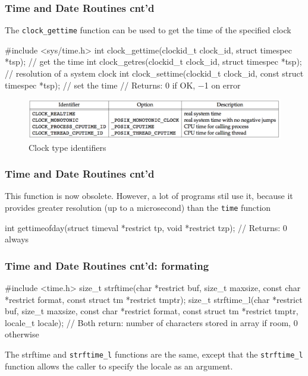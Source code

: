 \documentclass[newPxFont,sthlmFooter,nooffset]{beamer}
\begin{document}
\begin{frame}[containsverbatim,t]
  \frametitle{Time and Date Routines cnt'd}

The \texttt{clock\_gettime} function can be used to get the time of the specified clock

\begin{codedef}
#include <sys/time.h>
int clock_gettime(clockid_t clock_id, struct timespec *tsp); // get the time
int clock_getres(clockid_t clock_id, struct timespec *tsp); // resolution of a system clock
int clock_settime(clockid_t clock_id, const struct timespec *tsp); // set the time
// Returns: 0 if OK, −1 on error
\end{codedef}

\begin{figure}[h]
  \centering
  \includegraphics[width=\textwidth]{figure/fig6-8_clock.png}
  \caption{Clock type identifiers}
\end{figure}

\end{frame}

\begin{frame}[containsverbatim,t]
  \frametitle{Time and Date Routines cnt'd}
This function is now obsolete. However, a lot of programs stil use it, because it provides greater resolution (up to a microsecond) than the \texttt{time} function
\begin{codedef}
int gettimeofday(struct timeval *restrict tp, void *restrict tzp);
// Returns: 0 always
\end{codedef}


\end{frame}


\begin{frame}[containsverbatim,t]
  \frametitle{Time and Date Routines cnt'd: formating}

\begin{codedef}
#include <time.h>
size_t strftime(char *restrict buf, size_t maxsize, const char *restrict format, const struct tm *restrict tmptr);
size_t strftime_l(char *restrict buf, size_t maxsize, const char *restrict format, const struct tm *restrict tmptr, locale_t locale);
// Both return: number of characters stored in array if room, 0 otherwise
\end{codedef}

The strftime and \texttt{strftime\_l} functions are the same, except that the \texttt{strftime\_l} function allows the caller to specify the locale as an argument.

\end{frame}
\end{document}
